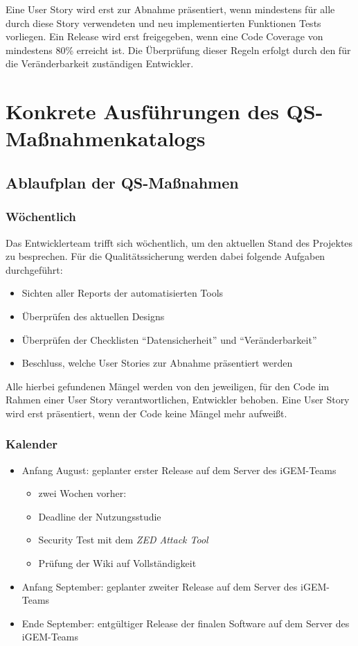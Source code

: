 Eine User Story wird erst zur Abnahme präsentiert, wenn mindestens für alle durch diese Story verwendeten und neu implementierten Funktionen Tests vorliegen. Ein Release wird erst freigegeben, wenn eine Code Coverage von mindestens 80\% erreicht ist. Die Überprüfung dieser Regeln erfolgt durch den für die Veränderbarkeit zuständigen Entwickler.


\appendix
\chapter{Konkrete Ausführungen des QS-Maßnahmenkatalogs}
\section{Ablaufplan der QS-Maßnahmen}

\subsection{Wöchentlich}
Das Entwicklerteam trifft sich wöchentlich, um den aktuellen Stand des Projektes zu besprechen. Für die Qualitätssicherung werden dabei folgende Aufgaben durchgeführt:
\begin{itemize}
	\item Sichten aller Reports der automatisierten Tools
	\item Überprüfen des aktuellen Designs
	\item Überprüfen der Checklisten "`Datensicherheit"' und "`Veränderbarkeit"'
	\item Beschluss, welche User Stories zur Abnahme präsentiert werden
\end{itemize}

Alle hierbei gefundenen Mängel werden von den jeweiligen, für den Code im Rahmen einer User Story verantwortlichen, Entwickler behoben. Eine User Story wird erst präsentiert, wenn der Code keine Mängel mehr aufweißt.

\subsection{Kalender}
\begin{itemize}
	\item Anfang August: geplanter erster Release auf dem Server des iGEM-Teams
	\begin{itemize}
		\item zwei Wochen vorher:
		\item Deadline der Nutzungsstudie
		\item Security Test mit dem \emph{ZED Attack Tool}
		\item Prüfung der Wiki auf Vollständigkeit
	\end{itemize}
	\item Anfang September: geplanter zweiter Release auf dem Server des iGEM-Teams
	\item Ende September: entgültiger Release der finalen Software auf dem Server des iGEM-Teams
\end{itemize}

